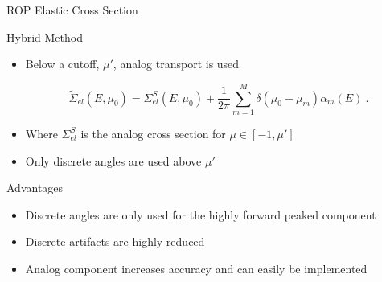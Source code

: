 \documentclass{beamer}
\begin{document}
\begin{frame}{ROP Elastic Cross Section}

\begin{block}{Hybrid Method}

  \begin{itemize}
    \item Below a cutoff, $\mu'$, analog transport is used
    
    	\begin{equation}
		\tilde{\Sigma}_{el}(E,\mu_0) 
		= \Sigma^S_{el}(E,\mu_0) + \frac{1}{2\pi}\sum_{m=1}^{M} \delta(\mu_0-\mu_m)\alpha_m(E)~.
		\label{eq:hybrid_elastic_dcs}
	\end{equation}
	
    \item Where $ \Sigma^S_{el}$ is the analog cross section for $\mu \in [-1,\mu']$
    \item Only discrete angles are used above  $\mu'$
  \end{itemize}

\end{block}

\begin{block}{Advantages}
  \begin{itemize}
    \item Discrete angles are only used for the highly forward peaked component
    \item Discrete artifacts are highly reduced
    \item Analog component increases accuracy and can easily be implemented
  \end{itemize}
\end{block}

\end{frame}
\end{document}
